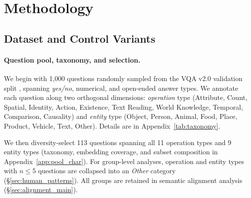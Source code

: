 \documentclass[letterpaper]{article}
\begin{document}
\section{Methodology}
\label{sec:setup}

\subsection{Dataset and Control Variants}
\label{sec:dataset}

\paragraph{Question pool, taxonomy, and selection.}
We begin with 1{,}000 questions randomly sampled from the VQA v2.0 validation split
\citep{goyal2016making}, spanning \textit{yes/no}, numerical, and open-ended answer types.
We annotate each question along two orthogonal dimensions: \emph{operation} type (Attribute, Count, Spatial, Identity, Action, Existence, Text Reading, World Knowledge, Temporal, Comparison, Causality) and \emph{entity} type (Object, Person, Animal, Food, Place, Product, Vehicle, Text, Other). Details are in Appendix~\ref{tab:taxonomy}. 

We then diversity-select 113 questions spanning all 11 operation types and 9 entity types (taxonomy, embedding coverage, and subset composition in Appendix~\ref{app:pool_char}).
For group-level analyses, operation and entity types with $n \leq 5$ questions are collapsed into an \emph{Other} category (\S\ref{sec:human_patterns}). %
All groups are retained in semantic alignment analysis (\S\ref{sec:alignment_main}). %
\end{document}
